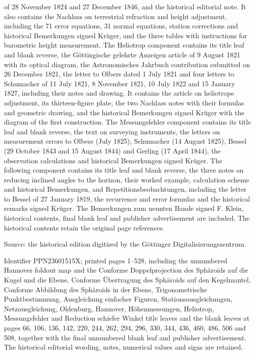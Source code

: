 of 28 November 1824 and 27 December 1846, and the historical editorial note.
It also contains the Nachlass on terrestrial refraction and height adjustment,
including the 71 error equations, 31 normal equations, station corrections
and historical Bemerkungen signed Krüger, and the three tables with
instructions for barometric height measurement.
The Heliotrop component contains its title leaf and blank reverse,
the Göttingische gelehrte Anzeigen article of 9 August 1821 with its optical
diagram, the Astronomisches Jahrbuch contribution submitted on 26 December
1821, the letter to Olbers dated 1 July 1821 and four letters to Schumacher
of 11 July 1821, 8 November 1821, 10 July 1822 and 15 January 1827,
including their notes and drawing. It contains the article on heliotrope
adjustment, its thirteen-figure plate, the two Nachlass notes with their
formulas and geometric drawing, and the historical Bemerkungen signed Krüger
with the diagram of the first construction.
The Messungsfehler component contains its title leaf and blank reverse,
the text on surveying instruments, the letters on measurement errors
to Olbers (July 1825), Schumacher (14 August 1825), Bessel
(29 October 1843 and 15 August 1844) and Gerling (17 April 1844),
the observation calculations and historical Bemerkungen signed Krüger.
The following component contains its title leaf and blank reverse,
the three notes on reducing inclined angles to the horizon, their worked
example, calculation scheme and historical Bemerkungen, and
Repetitionsbeobachtungen, including the letter to Bessel of 27 January
1819, the recurrence and error formulas and the historical remarks signed
Krüger. The Bemerkungen zum neunten Bande signed F. Klein, historical
contents, final blank leaf and publisher advertisement are included.
The historical contents retain the original page references.

\par\endgroup
\clearpage
\begingroup\small
Source: the historical edition digitized by the Göttinger
Digitalisierungszentrum.\par
\noindent Identifier PPN23601515X; printed pages
1--528, including the unnumbered Hannover foldout map and the Conforme Doppelprojection des Sphäroids auf die Kugel und die Ebene, Conforme Übertragung des Sphäroids auf den Kegelmantel, Conforme Abbildung des Sphäroids in der Ebene, Trigonometrische Punktbestimmung, Ausgleichung einfacher Figuren, Stationsausgleichungen, Netzausgleichung, Oldenburg, Hannover, Höhenmessungen, Heliotrop, Messungsfehler and Reduction schiefer Winkel title leaves and the blank leaves at pages 66, 106, 136, 142, 220, 244, 262, 294, 296, 330, 344, 436, 460, 486, 506 and 508, together with the final unnumbered blank leaf and publisher advertisement. The historical editorial wording, notes,
numerical values and signs are retained.

